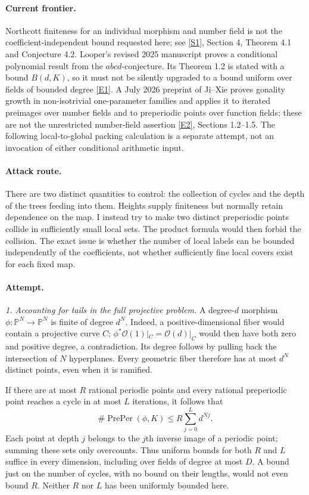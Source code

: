 \documentclass[11pt,a4paper]{article}
\newcommand{\PP}{\mathbb P}
\newcommand{\sref}[2]{\hyperlink{source:#1:#2}{[S#2]}}
\newcommand{\eref}[2]{\hyperlink{extra:#1:#2}{[E#2]}}
\begin{document}
\paragraph{Current frontier.}
Northcott finiteness for an individual morphism and number field is not the
coefficient-independent bound requested here; see \sref{30006792}{1}, Section 4,
Theorem 4.1 and Conjecture 4.2. Looper's revised 2025 manuscript proves a
conditional polynomial result from the $abcd$-conjecture. Its Theorem 1.2 is
stated with a bound $B(d,K)$, so it must not be silently upgraded to a bound
uniform over fields of bounded degree \eref{30006792}{1}. A July 2026 preprint of
Ji--Xie proves gonality growth in non-isotrivial one-parameter families and
applies it to iterated preimages over number fields and to preperiodic points
over function fields; these are not the unrestricted number-field assertion
\eref{30006792}{2}, Sections 1.2--1.5. The following local-to-global packing
calculation is a separate attempt, not an invocation of either conditional
arithmetic input.

\paragraph{Attack route.}
There are two distinct quantities to control: the collection of cycles and
the depth of the trees feeding into them. Heights supply finiteness but
normally retain dependence on the map. I instead try to make two distinct
preperiodic points collide in sufficiently small local sets. The product
formula would then forbid the collision. The exact issue is whether the
number of local labels can be bounded independently of the coefficients,
not whether sufficiently fine local covers exist for each fixed map.

\paragraph{Attempt.}
\textit{1. Accounting for tails in the full projective problem.}
A degree-$d$ morphism $\phi:\PP^N\to\PP^N$ is finite of degree $d^N$.
Indeed, a positive-dimensional fiber would contain a projective curve $C$;
$\phi^*\mathcal O(1)|_C=\mathcal O(d)|_C$ would then have both zero and
positive degree, a contradiction. Its degree follows by pulling back the
intersection of $N$ hyperplanes. Every geometric fiber therefore has at most
$d^N$ distinct points, even when it is ramified.

If there are at most $R$ rational periodic points and every rational
preperiodic point reaches a cycle in at most $L$ iterations, it follows that
\[
 \#\operatorname{PrePer}(\phi,K)
 \le R\sum_{j=0}^{L}d^{Nj}.                                    \tag{212.1}
\]
Each point at depth $j$ belongs to the $j$th inverse image of a periodic
point; summing these sets only overcounts. Thus uniform bounds for both
$R$ and $L$ suffice in every dimension, including over fields of degree at
most $D$. A bound just on the number of cycles, with no bound on their
lengths, would not even bound $R$. Neither $R$ nor $L$ has been uniformly
bounded here.
\end{document}
